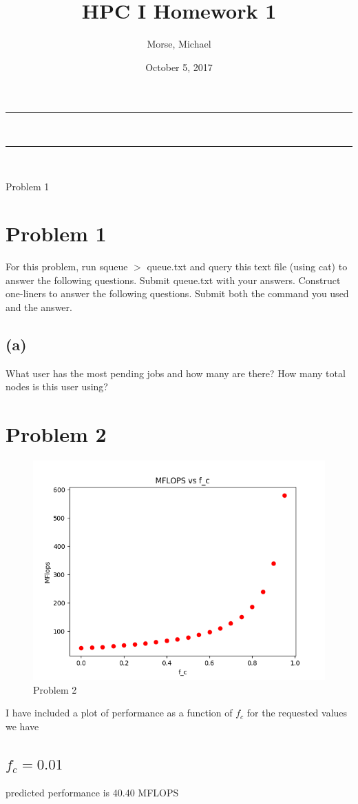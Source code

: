 \documentclass[12pt]{article}
\title{HPC I Homework 1}
\author{Morse, Michael}
\date{October 5, 2017}
\makeatletter
\newcommand{\nline}{\rule{\linewidth}{0.5pt}}
\theoremstyle{plain}
\theoremstyle{definition}
\renewcommand{\maketitle}{
\begin{center}
\nline\\
\vspace{2ex}
{\huge \textsc{\@title}}
\nline\\
{\large\textsc{\@author \hfill \@date}}
\vspace{4ex}
\end{center}
}
\makeatother
\begin{document}
\maketitle

Problem 1

\section*{Problem 1}
For this problem, run squeue $>$ queue.txt and query this text file (using cat) to answer
the following questions. Submit queue.txt with your answers. Construct one-liners to
answer the following questions. Submit both the command you used and the answer.
\subsection*{(a)}
What user has the most pending jobs and how many are there? How many total
nodes is this user using?

\section*{Problem 2}

\begin{figure}
\label{fig:problem2}
\includegraphics[scale=0.7]{problem2.png}
\caption{Problem 2}
\end{figure}
I have included a plot of performance as a function of $f_c$ for the requested values we have
\subsection{$f_c = 0.01$}
predicted performance is 40.40 MFLOPS
\end{document}
